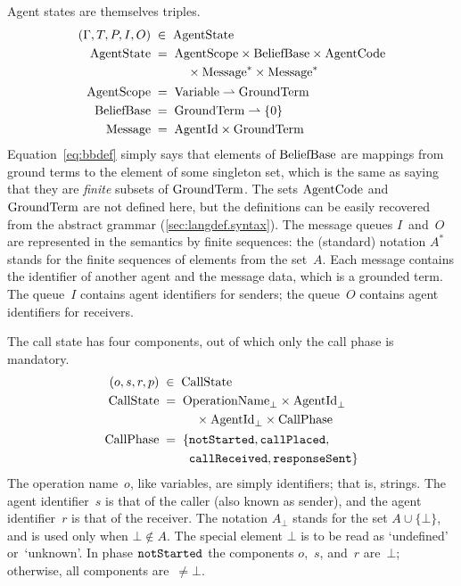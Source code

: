 \documentclass[a4paper,12pt,oneside,fleqn]{book} %
\newcommand{\pmap}{\rightharpoonup}
\begin{document}
Agent states are themselves triples.
\begin{align}
(\Gamma, T, P, I, O) &\;\in\; {\rm AgentState}
\\
{\rm AgentState} &\;=\;
  \begin{aligned}[t]
    &{\rm AgentScope} \times{\rm BeliefBase} \times{\rm AgentCode} \\
    &\quad\times{\rm Message}^* \times{\rm Message}^*
  \end{aligned}
\\
{\rm AgentScope} &\;=\; {\rm Variable}\pmap{\rm GroundTerm}
\\
{\rm BeliefBase} &\;=\; {\rm GroundTerm}\pmap\{0\} \label{eq:bbdef}
\\
{\rm Message} &\;=\; {\rm AgentId}\times{\rm GroundTerm}
\end{align}
Equation~\eqref{eq:bbdef} simply says that elements of ${\rm BeliefBase}$
are mappings from ground terms to the element of some singleton set, which
is the same as saying that they are \emph{finite} subsets of ${\rm
GroundTerm}$. The sets ${\rm AgentCode}$ and ${\rm GroundTerm}$ are not
defined here, but the definitions can be easily recovered from the abstract
grammar (\autoref{sec:langdef.syntax}). The message queues $I$~and~$O$ are
represented in the semantics by finite sequences: the (standard) notation
$A^*$ stands for the finite sequences of elements from the set~$A$. Each
message contains the identifier of another agent and the message data,
which is a grounded term. The queue~$I$ contains agent identifiers for
senders; the queue~$O$ contains agent identifiers for receivers.

The call state has four components, out of which only the call phase is
mandatory.
\begin{align}
(o,s,r,p) &\;\in\; {\rm CallState}
\\
{\rm CallState} &\;=\;
  \begin{aligned}[t]
  &{\rm OperationName}_\bot\times{\rm AgentId}_\bot \\
  &\quad\times{\rm AgentId}_\bot\times{\rm CallPhase}
  \end{aligned}
\\
{\rm CallPhase} &\;=\;
  \begin{aligned}[t]
  \{  &{\tt notStarted}, {\tt callPlaced},\\
      &{\tt callReceived}, {\tt responseSent} \}
  \end{aligned}
\end{align}
The operation name~$o$, like variables, are simply identifiers; that is,
strings. The agent identifier~$s$ is that of the caller (also known as
sender), and the agent identifier~$r$ is that of the receiver. The notation
$A_\bot$ stands for the set $A\cup\{\bot\}$, and is used only when
$\bot\notin A$. The special element $\bot$ is to be read as `undefined'
or~`unknown'. In phase ${\tt notStarted}$ the components $o$,~$s$, and~$r$
are~$\bot$; otherwise, all components are~$\ne\bot$.
\end{document}
